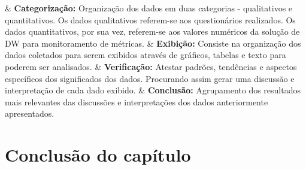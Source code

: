 \begin{easylist}[itemize]	
	
	& \textbf{Categorização: } Organização dos dados em duas categorias - qualitativos e quantitativos. Os 		dados qualitativos referem-se aos questionários realizados. Os dados quantitativos, por sua vez, 			referem-se aos valores numéricos da solução de DW para monitoramento de métricas. 
	& \textbf{Exibição: } Consiste na organização dos dados coletados para serem exibidos através de 				gráficos, tabelas e texto para poderem ser analisados. 
	& \textbf{Verificação: } Atestar padrões, tendências e aspectos específicos dos significados dos 				dados. Procurando assim gerar uma discussão e interpretação de cada dado exibido.
	& \textbf{Conclusão: } Agrupamento dos resultados mais relevantes das discussões e interpretações dos 			dados anteriormente apresentados.
	
	\end{easylist}	


\section{Conclusão do capítulo}

\label{estudo de caso}

